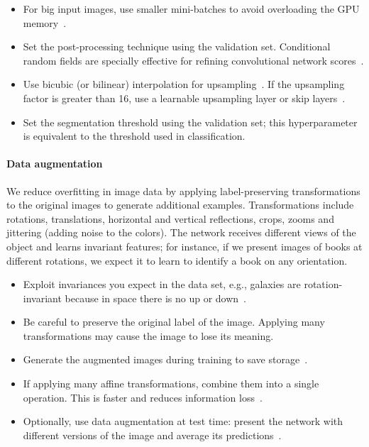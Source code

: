 \begin{itemize}
	\item For big input images, use smaller mini-batches to avoid overloading the GPU memory~\cite{Karpathy2016}.

	\item Set the post-processing technique using the validation set. Conditional random fields are specially effective for refining convolutional network scores~\cite{Chen2015}.

	\item Use bicubic (or bilinear) interpolation for upsampling~\cite{Chen2015}. If the upsampling factor is greater than 16, use a learnable upsampling layer or skip layers~\cite{Long2015}.

	\item Set the segmentation threshold using the validation set; this hyperparameter is equivalent to the threshold used in classification.
\end{itemize}

\paragraph{Data augmentation} We reduce overfitting in image data by applying label-preserving transformations to the original images to generate additional examples. Transformations include rotations, translations, horizontal and vertical reflections, crops, zooms and jittering (adding noise to the colors).  The network receives different views of the object and learns invariant features; for instance, if we present images of books at different rotations, we expect it to learn to identify a book on any orientation.

\begin{itemize}
	\item Exploit invariances you expect in the data set, e.g., galaxies are rotation-invariant because in space there is no up or down~\cite{Dieleman2015}.%

	\item Be careful to preserve the original label of the image. Applying many transformations may cause the image to lose its meaning. 

	\item Generate the augmented images during training to save storage~\cite{Krizhevsky2012}.

	\item If applying many affine transformations, combine them into a single operation. This is faster and reduces information loss~\cite{Dieleman2015}.

	\item Optionally, use data augmentation at test time: present the network with different versions of the image and average its predictions~\cite{Krizhevsky2012}.
\end{itemize}

